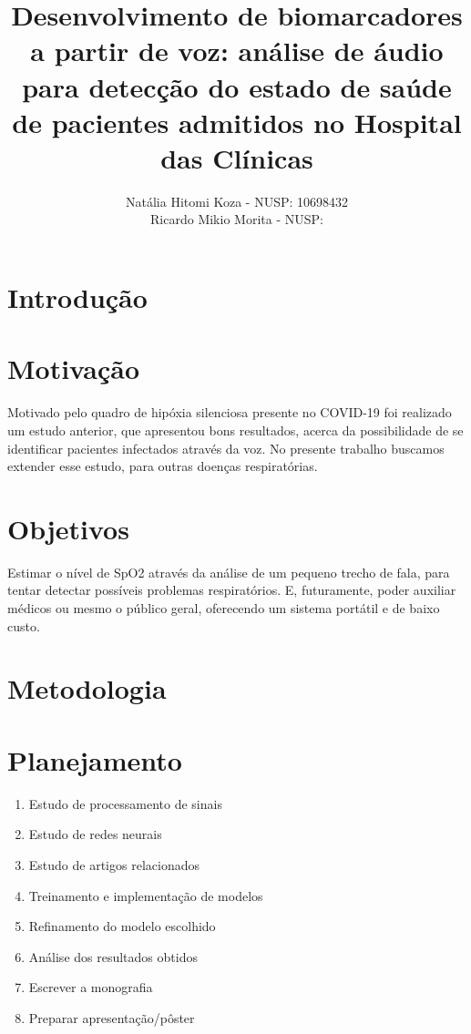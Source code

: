 \documentclass[12pt, a4paper]{article}
\begin{document}
\title{Desenvolvimento de biomarcadores a partir de voz: análise de áudio para detecção do estado de saúde de pacientes admitidos no Hospital das Clínicas}

\author{Natália Hitomi Koza - NUSP: 10698432\\Ricardo Mikio Morita - NUSP: }
\maketitle

\section{Introdução}

\section{Motivação}

Motivado pelo quadro de hipóxia silenciosa presente no COVID-19 foi realizado um estudo anterior, que apresentou bons resultados, acerca da possibilidade de se identificar pacientes infectados através da voz. No presente trabalho buscamos extender esse estudo, para outras doenças respiratórias.


\section{Objetivos}

Estimar o nível de SpO2 através da análise de um pequeno trecho de fala, para tentar detectar possíveis problemas respiratórios. E, futuramente, poder auxiliar médicos ou mesmo o público geral, oferecendo um sistema portátil e de baixo custo.

\section{Metodologia}

\section{Planejamento}

\begin{enumerate}
    \item Estudo de processamento de sinais
    \item Estudo de redes neurais
    \item Estudo de artigos relacionados
    \item Treinamento e implementação de modelos
    \item Refinamento do modelo escolhido
    \item Análise dos resultados obtidos
    \item Escrever a monografia
    \item Preparar apresentação/pôster
\end{enumerate}
\end{document}
